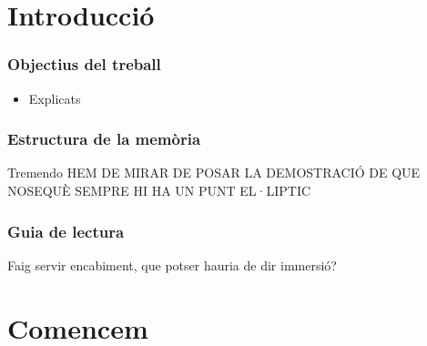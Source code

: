 \chapter{Introducci\'o}



\subsection*{Objectius del treball}

\begin{itemize}
    \item Explicats
\end{itemize}

\subsection*{Estructura de la mem\`oria}
Tremendo
HEM DE MIRAR DE POSAR LA DEMOSTRACIÓ DE QUE NOSEQUÈ SEMPRE HI HA UN PUNT EL·LIPTIC
\subsection*{Guia de lectura}
Faig servir encabiment, que potser hauria de dir immersió?

\newpage

\setcounter{page}{1}


\chapter{Comencem}
